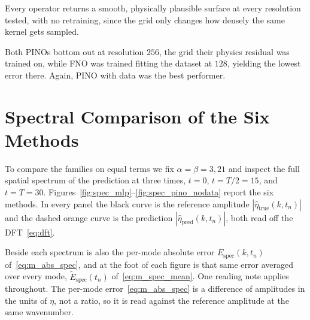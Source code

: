 Every operator returns a smooth, physically plausible surface at every resolution tested, with no retraining, since the grid only changes how densely the same kernel gets sampled.  

Both PINOs bottom out at resolution $256$, the grid their physics residual was trained on, while FNO was trained fitting the dataset at $128$, yielding the lowest error there. Again, PINO with data was the best performer.

\section{Spectral Comparison of the Six Methods}
\label{sec:r_spectrum}

To compare the families on equal terms we fix $\alpha = \beta = 3{,}21$ and inspect the full spatial spectrum of the prediction at three times, $t = 0$, $t = T/2 = 15$, and $t = T = 30$. Figures~\ref{fig:spec_mlp}--\ref{fig:spec_pino_nodata} report the six methods. In every panel the black curve is the reference amplitude $|\hat\eta_{\text{true}}(k,t_n)|$ and the dashed orange curve is the prediction $|\hat\eta_{\text{pred}}(k,t_n)|$, both read off the DFT~\eqref{eq:dft}. 

Beside each spectrum is also the per-mode absolute error $E_{\text{spec}}(k,t_n)$ of~\eqref{eq:m_abs_spec}, and at the foot of each figure is that same error averaged over every mode, $\widetilde{E}_{\text{spec}}(t_n)$ of~\eqref{eq:m_spec_mean}. One reading note applies throughout. The per-mode error~\eqref{eq:m_abs_spec} is a difference of amplitudes in the units of $\eta$, not a ratio, so it is read against the reference amplitude at the same wavenumber.

